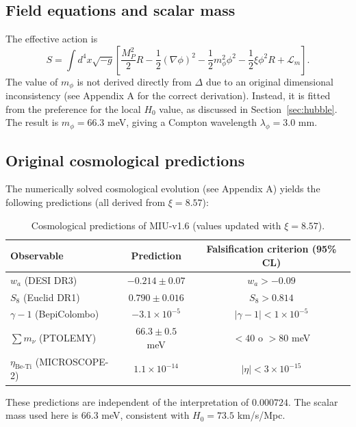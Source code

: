 \documentclass[12pt, a4paper]{article}
\theoremstyle{miuThm}
\theoremstyle{remark}
\newcommand{\eps}{0.000724}
\begin{document}
\subsection{Field equations and scalar mass}
The effective action is
\begin{equation}
S = \int d^4x\sqrt{-g}\left[ \frac{M_P^2}{2}R - \frac12(\nabla\phi)^2 - \frac12 m_\phi^2\phi^2 - \frac12\xi\phi^2 R + \mathcal{L}_m \right].
\end{equation}
The value of $m_\phi$ is not derived directly from $\Delta$ due to an original dimensional inconsistency (see Appendix A for the correct derivation). Instead, it is fitted from the preference for the local $H_0$ value, as discussed in Section~\ref{sec:hubble}. The result is $m_\phi = 66.3$ meV, giving a Compton wavelength $\lambda_\phi = 3.0$ mm.

\subsection{Original cosmological predictions}
The numerically solved cosmological evolution (see Appendix A) yields the following predictions (all derived from $\xi=8.57$):

\begin{table}[h!]
\centering
\caption{Cosmological predictions of MIU-v1.6 (values updated with $\xi=8.57$).}
\label{tab:cosmo_pred}
\begin{tabular}{lcc}
\toprule
\textbf{Observable} & \textbf{Prediction} & \textbf{Falsification criterion (95\% CL)} \\
\midrule
$w_a$ (DESI DR3) & $-0.214 \pm 0.07$ & $w_a > -0.09$ \\
$S_8$ (Euclid DR1) & $0.790 \pm 0.016$ & $S_8 > 0.814$ \\
$\gamma-1$ (BepiColombo) & $-3.1\times10^{-5}$ & $|\gamma-1| < 1\times10^{-5}$ \\
$\sum m_\nu$ (PTOLEMY) & $66.3 \pm 0.5$ meV & $<40$ o $>80$ meV \\
$\eta_{\text{Be-Ti}}$ (MICROSCOPE-2) & $1.1\times10^{-14}$ & $|\eta| < 3\times10^{-15}$ \\
\bottomrule
\end{tabular}
\end{table}

These predictions are independent of the interpretation of $\eps$. The scalar mass used here is $66.3$ meV, consistent with $H_0=73.5$ km/s/Mpc.

\clearpage
\end{document}

